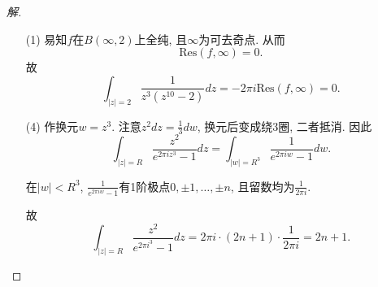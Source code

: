 \documentclass{article}[a4paper, 12pt]
\theoremstyle{mystyle}
\newenvironment{solution}{\begin{proof}[解]}{\end{proof}}
\begin{document}
\begin{solution}
  \begin{itemize}
    \item [(1)] 易知\(f\)在\(B(\infty,2)\)上全纯, 且\(\infty\)为可去奇点. 从而\[\text{Res}(f,\infty)=0.\] 故\[\int_{|z|=2}\frac{1}{z^3(z^{10}-2)}dz=-2\pi i\text{Res}(f,\infty)=0.\]
    \item [(4)] 作换元\(w=z^3\). 注意\(z^2dz=\frac13dw\), 换元后变成绕3圈, 二者抵消. 因此\[\int_{|z|=R}\frac{z^2}{e^{2\pi i z^3}-1}dz = \int_{|w|=R^3}\frac{1}{e^{2\pi i w}-1}dw.\]
    
    在\(|w|<R^3\), \(\frac{1}{e^{2\pi i w}-1}\)有1阶极点\(0,\pm1,\dots,\pm n\), 且留数均为\(\frac{1}{2\pi i}\).

    故\[\int_{|z|=R}\frac{z^2}{e^{2\pi i ^3}-1}dz=2\pi i\cdot(2n+1)\cdot\frac{1}{2\pi i}=2n+1. \tag*{\(\qed\)}\]
  \end{itemize}
  \renewcommand{\qedsymbol}{}
\end{solution}
\end{document}
